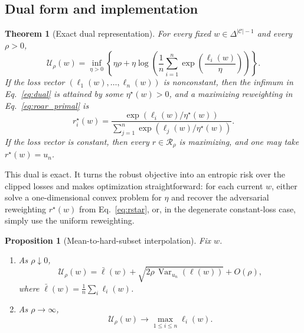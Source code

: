 \documentclass{article}
\newtheorem{theorem}{Theorem}
\newtheorem{proposition}{Proposition}
\newcommand{\cC}{\mathcal{C}}
\newcommand{\cR}{\mathcal{R}}
\newcommand{\simplex}{\Delta}
\begin{document}
\subsection{Dual form and implementation}

\begin{theorem}[Exact dual representation]
\label{thm:dual}
For every fixed $w\in\simplex^{|\cC|-1}$ and every $\rho>0$,
\begin{equation}
    \mathcal U_{\rho}(w)
    =
    \inf_{\eta>0}
    \left\{
        \eta \rho
        +
        \eta \log\!\left(
            \frac{1}{n}\sum_{i=1}^{n}
            \exp\!\left(\frac{\ell_i(w)}{\eta}\right)
        \right)
    \right\}.
    \label{eq:dual}
\end{equation}
If the loss vector $(\ell_1(w),\dots,\ell_n(w))$ is nonconstant, then the infimum in Eq.~\eqref{eq:dual} is attained by some $\eta^{\star}(w)>0$, and a maximizing reweighting in Eq.~\eqref{eq:roar_primal} is
\begin{equation}
    r_i^{\star}(w)
    =
    \frac{\exp(\ell_i(w)/\eta^{\star}(w))}
    {\sum_{j=1}^{n}\exp(\ell_j(w)/\eta^{\star}(w))}.
    \label{eq:rstar}
\end{equation}
If the loss vector is constant, then every $r\in\cR_{\rho}$ is maximizing, and one may take $r^{\star}(w)=u_n$.
\end{theorem}

This dual is exact. It turns the robust objective into an entropic risk over the clipped losses and makes optimization straightforward: for each current $w$, either solve a one-dimensional convex problem for $\eta$ and recover the adversarial reweighting $r^{\star}(w)$ from Eq.~\eqref{eq:rstar}, or, in the degenerate constant-loss case, simply use the uniform reweighting.

\begin{proposition}[Mean-to-hard-subset interpolation]
\label{prop:limits}
Fix $w$.
\begin{enumerate}[label=(\roman*),leftmargin=1.4em]
    \item As $\rho\downarrow 0$,
    \[
        \mathcal U_{\rho}(w)
        =
        \bar \ell(w)
        +
        \sqrt{2\rho \,\operatorname{Var}_{u_n}(\ell(w))}
        +
        O(\rho),
    \]
    where $\bar \ell(w)=\frac{1}{n}\sum_i \ell_i(w)$.
    \item As $\rho\to\infty$,
    \[
        \mathcal U_{\rho}(w)\to \max_{1\le i\le n}\ell_i(w).
    \]
\end{enumerate}
\end{proposition}
\end{document}
